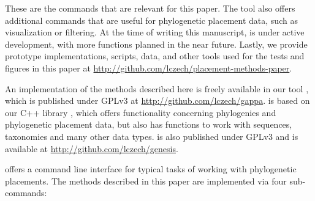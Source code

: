 These are the  commands that are relevant for this paper.
The tool also offers additional commands that are useful for phylogenetic placement data, such as visualization or filtering.
At the time of writing this manuscript,  is under active development,
with more functions planned in the near future.
Lastly, we provide prototype implementations, scripts, data, and other tools
used for the tests and figures in this paper at \url{http://github.com/lczech/placement-methods-paper}.



An implementation of the methods described here is freely available in our tool ,
which is published under GPLv3 at \url{http://github.com/lczech/gappa}.
 is based on our C++ library ,
which offers functionality concerning phylogenies and phylogenetic placement data,
but also has functions to work with sequences, taxonomies and many other data types.
 is also published under GPLv3 and is available at \url{http://github.com/lczech/genesis}.

 offers a command line interface for typical tasks of working with phylogenetic placements.
The methods described in this paper are implemented via four sub-commands:

